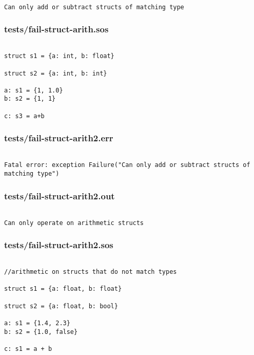 \documentclass[main.tex]{subfiles}
\begin{document}
\begin{lstlisting}

Can only add or subtract structs of matching type
\end{lstlisting}

\subsubsection{tests/fail-struct-arith.sos}

\begin{lstlisting}

struct s1 = {a: int, b: float}

struct s2 = {a: int, b: int}

a: s1 = {1, 1.0}
b: s2 = {1, 1}

c: s3 = a+b
\end{lstlisting}

\subsubsection{tests/fail-struct-arith2.err}

\begin{lstlisting}

Fatal error: exception Failure("Can only add or subtract structs of matching type")
\end{lstlisting}

\subsubsection{tests/fail-struct-arith2.out}

\begin{lstlisting}

Can only operate on arithmetic structs
\end{lstlisting}

\subsubsection{tests/fail-struct-arith2.sos}

\begin{lstlisting}

//arithmetic on structs that do not match types

struct s1 = {a: float, b: float}

struct s2 = {a: float, b: bool}

a: s1 = {1.4, 2.3}
b: s2 = {1.0, false}

c: s1 = a + b

\end{lstlisting}
\end{document}
